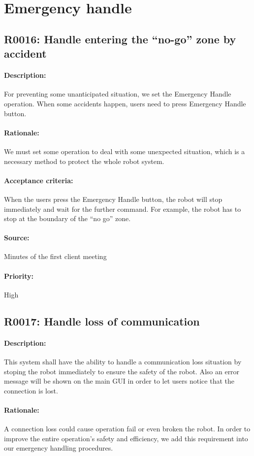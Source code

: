 \documentclass[11pt, a4paper]{report}
\begin{document}
\section{Emergency handle}
\subsection{R0016: Handle entering the “no-go” zone by accident}
\paragraph{Description:}
For preventing some unanticipated situation, we set the Emergency Handle operation. When some accidents happen, users need to press Emergency Handle button.
\paragraph{Rationale:}
We must set some operation to deal with some unexpected situation, which is a necessary method to protect the whole robot system. 
\paragraph{Acceptance criteria:}
When the users press the Emergency Handle button, the robot will stop immediately and wait for the further command. For example, the robot has to stop at the boundary of the “no go” zone. 
\paragraph{Source:}
 Minutes of the first client meeting 
\paragraph{Priority:}
High  


\subsection{R0017: Handle loss of communication}
\paragraph{Description:}
This system shall have the ability to handle a communication loss situation by stoping the robot immediately to ensure the safety of the robot. Also an error message will be shown on the main GUI in order to let users notice that the connection is lost. 
\paragraph{Rationale:}
A connection loss could cause operation fail or even broken the robot. In order to improve the entire operation's safety and efficiency, we add this requirement into our emergency handling procedures. 
\end{document}
